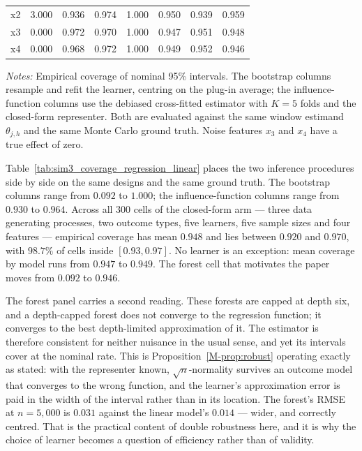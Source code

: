 \documentclass[12pt,a4paper]{article}
\numberwithin{equation}{section}
\theoremstyle{plain}
\theoremstyle{definition}
\begin{document}
\begin{table}[htbp]
\begin{threeparttable}
\begin{tabular}{lrrrrrrr}
				\quad x2 & 3.000 & 0.936 & 0.974 & 1.000 & 0.950 & 0.939 & 0.959 \\
				\quad x3 & 0.000 & 0.972 & 0.970 & 1.000 & 0.947 & 0.951 & 0.948 \\
				\quad x4 & 0.000 & 0.968 & 0.972 & 1.000 & 0.949 & 0.952 & 0.946 \\
				\bottomrule
				\end{tabular}
				\begin{tablenotes}
				\footnotesize
				\item \textit{Notes:} Empirical coverage of nominal 95\% intervals. The bootstrap columns resample and refit the learner, centring on the plug-in average; the influence-function columns use the debiased cross-fitted estimator with $K=5$ folds and the closed-form representer. Both are evaluated against the same window estimand $\theta_{j,h}$ and the same Monte Carlo ground truth. Noise features $x_3$ and $x_4$ have a true effect of zero.
				\end{tablenotes}
		\end{threeparttable}
	\end{table}
	
	Table~\ref{tab:sim3_coverage_regression_linear} places the two inference procedures side by side on the same designs and the same ground truth. The bootstrap columns range from $0.092$ to $1.000$; the influence-function columns range from $0.930$ to $0.964$. Across all 300 cells of the closed-form arm --- three data generating processes, two outcome types, five learners, five sample sizes and four features --- empirical coverage has mean $0.948$ and lies between $0.920$ and $0.970$, with $98.7\%$ of cells inside $[0.93, 0.97]$. No learner is an exception: mean coverage by model runs from $0.947$ to $0.949$. The forest cell that motivates the paper moves from $0.092$ to $0.946$.
	
	The forest panel carries a second reading. These forests are capped at depth six, and a depth-capped forest does not converge to the regression function; it converges to the best depth-limited approximation of it. The estimator is therefore consistent for neither nuisance in the usual sense, and yet its intervals cover at the nominal rate. This is Proposition~\ref{M-prop:robust} operating exactly as stated: with the representer known, $\sqrt{n}$-normality survives an outcome model that converges to the wrong function, and the learner's approximation error is paid in the width of the interval rather than in its location. The forest's RMSE at $n=5{,}000$ is $0.031$ against the linear model's $0.014$ --- wider, and correctly centred. That is the practical content of double robustness here, and it is why the choice of learner becomes a question of efficiency rather than of validity.
	
\end{document}
